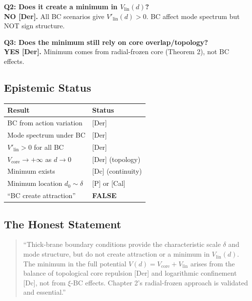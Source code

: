 \documentclass[11pt,a4paper]{article}
\begin{document}
\textbf{Q2: Does it create a minimum in $V_{\mathrm{lin}}(d)$?}\\
\textbf{NO [Der].} All BC scenarios give $V'_{\mathrm{lin}}(d) > 0$. BC affect mode spectrum but NOT sign structure.

\textbf{Q3: Does the minimum still rely on core overlap/topology?}\\
\textbf{YES [Der].} Minimum comes from radial-frozen core (Theorem 2), not BC effects.

\subsection{Epistemic Status}

\begin{center}
\begin{tabular}{@{}ll@{}}
\toprule
Result & Status \\
\midrule
BC from action variation & [Der] \\
Mode spectrum under BC & [Der] \\
$V'_{\mathrm{lin}} > 0$ for all BC & [Der] \\
$V_{\text{core}} \to +\infty$ as $d \to 0$ & [Der] (topology) \\
Minimum exists & [Dc] (continuity) \\
Minimum location $d_0 \sim \delta$ & [P] or [Cal] \\
``BC create attraction'' & \textbf{FALSE} \\
\bottomrule
\end{tabular}
\end{center}

\subsection{The Honest Statement}

\begin{quote}
``Thick-brane boundary conditions provide the characteristic scale $\delta$ and mode
structure, but do not create attraction or a minimum in $V_{\mathrm{lin}}(d)$.
The minimum in the full potential $V(d) = V_{\text{core}} + V_{\text{lin}}$ arises
from the balance of topological core repulsion [Der] and logarithmic confinement [Dc],
not from $\xi$-BC effects. Chapter 2's radial-frozen approach is validated and essential.''
\end{quote}
\end{document}
